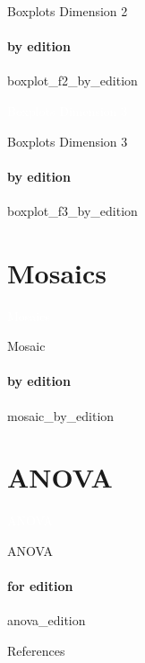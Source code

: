 {\nologo
\begin{frame}{Boxplots Dimension 2}
    \framesubtitle{by edition}
    {boxplot_f2_by_edition}
\end{frame}
}

{\nologo
{}
\begin{frame}[c,plain]{}
    \vspace*{1cm}
    \centering
    \Huge
    \textcolor{white}{Boxplots Dimension 3}
\end{frame}
}

{\nologo
\begin{frame}{Boxplots Dimension 3}
    \framesubtitle{by edition}
    {boxplot_f3_by_edition}
\end{frame}
}

\section{Mosaics}

{\nologo
{}
\begin{frame}[c,plain]{}
    \vspace*{1cm}
    \centering
    \Huge
    \textcolor{white}{Mosaics}
\end{frame}
}

{\nologo
\begin{frame}{Mosaic}
    \framesubtitle{by edition}
    {mosaic_by_edition}
\end{frame}
}

\section{ANOVA}

{\nologo
{}
\begin{frame}[c,plain]{}
    \vspace*{1cm}
    \centering
    \Huge
    \textcolor{white}{ANOVA}
\end{frame}
}

{\nologo
\begin{frame}{ANOVA}
    \framesubtitle{for edition}
    {anova_edition}
\end{frame}
}

\appendix

{\nologo
\begin{frame}[allowframebreaks]{References}
    \printbibliography
\end{frame}
}

